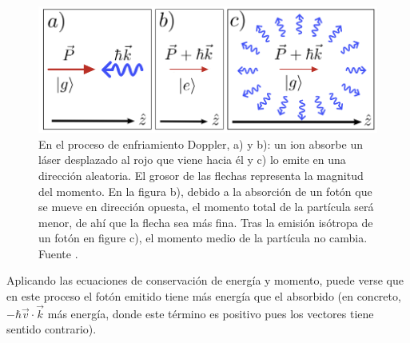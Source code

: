 	\begin{figure}[t]
    	\centering 
    	\includegraphics[width=0.8\linewidth]{Figuras/Fig_ions_dopple_cooling.png}
    	\caption{En el proceso de enfriamiento Doppler, a) y b): un ion absorbe un láser desplazado al rojo que viene hacia él y c) lo emite en una dirección aleatoria. El grosor de las flechas representa la magnitud del momento. En la figura b), debido a la absorción de un fotón que se mueve en dirección opuesta, el momento total de la partícula será menor, de ahí que la flecha sea más fina. Tras la emisión isótropa de un fotón en figure c), el momento medio de la partícula no cambia. Fuente \cite{bib_ions_main}.}
    	\label{Fig_ions_dopple_cooling}
	\end{figure}


Aplicando las ecuaciones de conservación de energía y momento, puede verse que en este proceso el fotón emitido tiene más energía que el absorbido (en concreto, $- \hbar \vec{v} \cdot \vec{k}$ más energía, donde este término es positivo pues los vectores tiene sentido contrario). 

